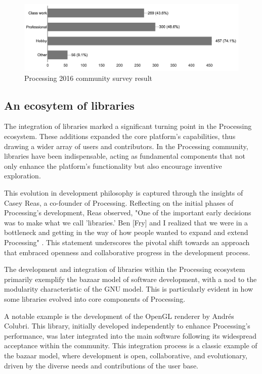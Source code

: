 \begin{figure}[h!]
	\centering
	\includegraphics[width=\textwidth]{images/community-survey.png}
	\caption{Processing 2016 community survey result \parencite{2016CommunitySurvey}}
	\label{fig:community_survey}
\end{figure}

\subsection{An ecosytem of libraries}
The integration of libraries marked a significant turning point in the Processing ecosystem. These additions expanded the core platform's capabilities, thus drawing a wider array of users and contributors. In the Processing community, libraries have been indispensable, acting as fundamental components that not only enhance the platform’s functionality but also encourage inventive exploration.

This evolution in development philosophy is captured through the insights of Casey Reas, a co-founder of Processing. Reflecting on the initial phases of Processing's development, Reas observed, "One of the important early decisions was to make what we call 'libraries.' Ben [Fry] and I realized that we were in a bottleneck and getting in the way of how people wanted to expand and extend Processing" \parencite[329]{conradGraphicDesignPostdigital2021}. This statement underscores the pivotal shift towards an approach that embraced openness and collaborative progress in the development process.

The development and integration of libraries within the Processing ecosystem primarily exemplify the bazaar model of software development, with a nod to the modularity characteristic of the GNU model. This is particularly evident in how some libraries evolved into core components of Processing.

A notable example is the development of the OpenGL renderer by Andrés Colubri. This library, initially developed independently to enhance Processing's performance, was later integrated into the main software following its widespread acceptance within the community. This integration process is a classic example of the bazaar model, where development is open, collaborative, and evolutionary, driven by the diverse needs and contributions of the user base. \parencite{Processing4CONTRIBUTINGMd}


